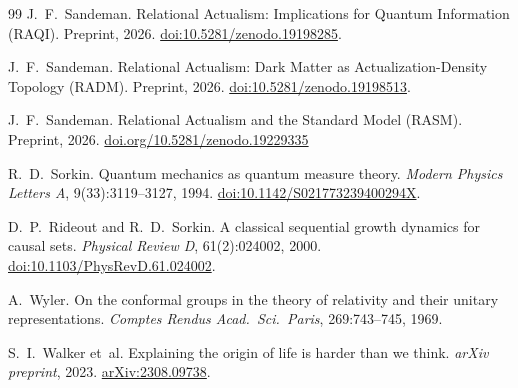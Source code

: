 \documentclass[11pt,a4paper]{article}
\begin{document}
\begin{thebibliography}{99}
J.~F.~Sandeman.
\newblock Relational Actualism: Implications for Quantum Information (RAQI).
\newblock Preprint, 2026.
\newblock \href{https://doi.org/10.5281/zenodo.19198285}%
  {doi:10.5281/zenodo.19198285}.

J.~F.~Sandeman.
\newblock Relational Actualism: Dark Matter as Actualization-Density
  Topology (RADM).
\newblock Preprint, 2026.
\newblock \href{https://doi.org/10.5281/zenodo.19198513}%
  {doi:10.5281/zenodo.19198513}.

J.~F.~Sandeman.
\newblock Relational Actualism and the Standard Model (RASM).
\newblock Preprint, 2026.
\newblock \href{https://doi.org/10.5281/zenodo.19229335}{doi.org/10.5281/zenodo.19229335}

R.~D.~Sorkin.
\newblock Quantum mechanics as quantum measure theory.
\newblock \emph{Modern Physics Letters A}, 9(33):3119--3127, 1994.
\newblock \href{https://doi.org/10.1142/S021773239400294X}%
  {doi:10.1142/S021773239400294X}.

D.~P.~Rideout and R.~D.~Sorkin.
\newblock A classical sequential growth dynamics for causal sets.
\newblock \emph{Physical Review D}, 61(2):024002, 2000.
\newblock \href{https://doi.org/10.1103/PhysRevD.61.024002}%
  {doi:10.1103/PhysRevD.61.024002}.

A.~Wyler.
\newblock On the conformal groups in the theory of relativity and their
  unitary representations.
\newblock \emph{Comptes Rendus Acad.~Sci.~Paris}, 269:743--745, 1969.

S.~I.~Walker et~al.
\newblock Explaining the origin of life is harder than we think.
\newblock \emph{arXiv preprint}, 2023.
\newblock \href{https://arxiv.org/abs/2308.09738}{arXiv:2308.09738}.

\end{thebibliography}
\end{document}
